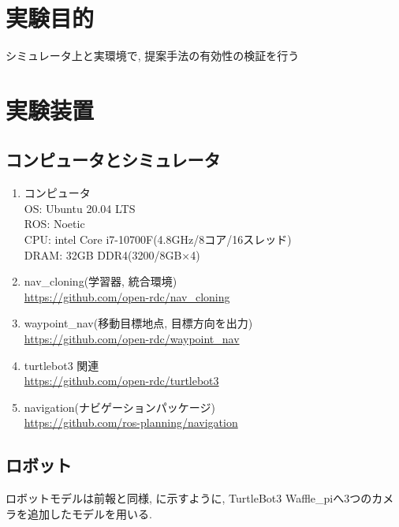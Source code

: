 

  \section{実験目的}
  シミュレータ上と実環境で, 提案手法の有効性の検証を行う
  \section{実験装置}
 \subsection{コンピュータとシミュレータ}
    \begin{enumerate}
      \item コンピュータ\\
      OS: Ubuntu 20.04 LTS\\
      ROS: Noetic\\
      CPU: intel Core i7-10700F(4.8GHz/8コア/16スレッド)\\
      DRAM: 32GB DDR4(3200/8GB×4)
      \item nav\_cloning(学習器, 統合環境)\\
      \url{https://github.com/open-rdc/nav_cloning}
      \item waypoint\_nav(移動目標地点, 目標方向を出力)\\
      \url{https://github.com/open-rdc/waypoint_nav}
      \newpage
      \item turtlebot3 関連\\
      \url{https://github.com/open-rdc/turtlebot3}
      \item navigation(ナビゲーションパッケージ)\\
      \url{https://github.com/ros-planning/navigation}
    \end{enumerate}

    \subsection{ロボット}
    ロボットモデルは前報\cite{okada1}\cite{okada2}と同様, に示すように, TurtleBot3 Waffle\_pi\cite{turtlebot3}へ3つのカメラを追加したモデルを用いる.

